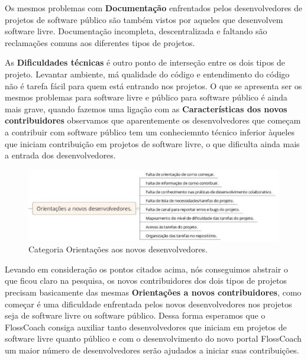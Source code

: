 Os mesmos problemas com \textbf{Documentação} enfrentados pelos desenvolvedores de 
projetos de software público são também vistos por aqueles que desenvolvem software 
livre. Documentação incompleta, descentralizada e faltando são reclamações comuns aos
diferentes tipos de projetos.

As \textbf{Dificuldades técnicas} é outro ponto de interseção entre os dois tipos
de projeto. Levantar ambiente, má qualidade do código e entendimento do código
não é tarefa fácil para quem está entrando nos projetos. O que se apresenta ser
os mesmos problemas para software livre e público para software público é ainda
mais grave, quando fazemos uma ligação com as \textbf{Características dos novos contribuidores}
observamos que aparentemente os desenvolvedores que começam a contribuir com software
público tem um conheciemnto técnico inferior àqueles que iniciam contribuição em 
projetos de software livre, o que dificulta ainda mais a entrada dos desenvolvedores.

\begin{figure}[h]
	\centering
	\label{fig:orientacoes}
		\includegraphics[keepaspectratio=true,scale=0.5]{figuras/orientacoes.eps}
	\caption{Categoria Orientações aos novos desenvolvedores.}
\end{figure}

Levando em consideração os pontos citados acima, nós conseguimos abstrair o que
ficou claro na pesquisa, os novos contribuidores dos dois tipos de projetos precisam
basicamente das mesmas \textbf{Orientações a novos contribuidores}, como começar é 
uma dificuldade enfrentada pelos novos desenvolvedores nos projetos seja de 
software livre ou software público. Dessa forma esperamos que o
FlossCoach consiga auxiliar tanto desenvolvedores que iniciam em projetos de software
livre quanto público e com o desenvolvimento do novo portal FlossCoach um maior
número de desenvolvedores serão ajudados a iniciar suas contribuições.


